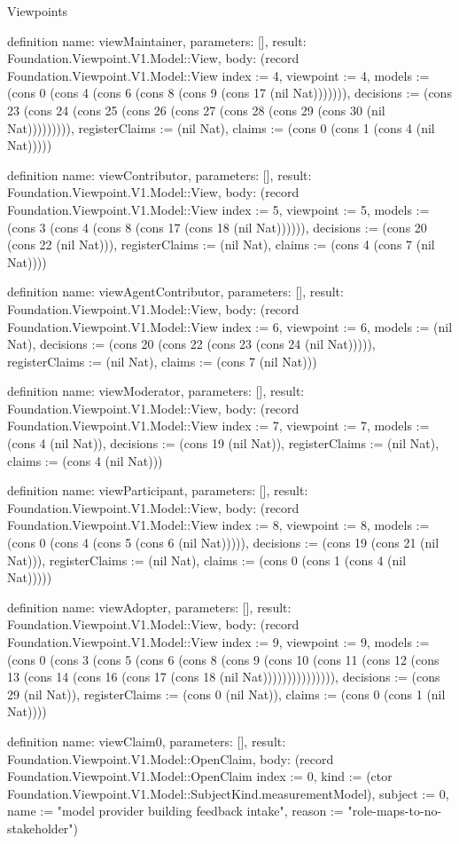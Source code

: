 \begin{lexlean}{Viewpoints}
\begin{semanticmodule}
definition{
  name: viewMaintainer,
  parameters: [],
  result: Foundation.Viewpoint.V1.Model::View,
  body: (record Foundation.Viewpoint.V1.Model::View {index := 4, viewpoint := 4, models := (cons 0 (cons 4 (cons 6 (cons 8 (cons 9 (cons 17 (nil Nat))))))), decisions := (cons 23 (cons 24 (cons 25 (cons 26 (cons 27 (cons 28 (cons 29 (cons 30 (nil Nat))))))))), registerClaims := (nil Nat), claims := (cons 0 (cons 1 (cons 4 (nil Nat))))})
}

definition{
  name: viewContributor,
  parameters: [],
  result: Foundation.Viewpoint.V1.Model::View,
  body: (record Foundation.Viewpoint.V1.Model::View {index := 5, viewpoint := 5, models := (cons 3 (cons 4 (cons 8 (cons 17 (cons 18 (nil Nat)))))), decisions := (cons 20 (cons 22 (nil Nat))), registerClaims := (nil Nat), claims := (cons 4 (cons 7 (nil Nat)))})
}

definition{
  name: viewAgentContributor,
  parameters: [],
  result: Foundation.Viewpoint.V1.Model::View,
  body: (record Foundation.Viewpoint.V1.Model::View {index := 6, viewpoint := 6, models := (nil Nat), decisions := (cons 20 (cons 22 (cons 23 (cons 24 (nil Nat))))), registerClaims := (nil Nat), claims := (cons 7 (nil Nat))})
}

definition{
  name: viewModerator,
  parameters: [],
  result: Foundation.Viewpoint.V1.Model::View,
  body: (record Foundation.Viewpoint.V1.Model::View {index := 7, viewpoint := 7, models := (cons 4 (nil Nat)), decisions := (cons 19 (nil Nat)), registerClaims := (nil Nat), claims := (cons 4 (nil Nat))})
}

definition{
  name: viewParticipant,
  parameters: [],
  result: Foundation.Viewpoint.V1.Model::View,
  body: (record Foundation.Viewpoint.V1.Model::View {index := 8, viewpoint := 8, models := (cons 0 (cons 4 (cons 5 (cons 6 (nil Nat))))), decisions := (cons 19 (cons 21 (nil Nat))), registerClaims := (nil Nat), claims := (cons 0 (cons 1 (cons 4 (nil Nat))))})
}

definition{
  name: viewAdopter,
  parameters: [],
  result: Foundation.Viewpoint.V1.Model::View,
  body: (record Foundation.Viewpoint.V1.Model::View {index := 9, viewpoint := 9, models := (cons 0 (cons 3 (cons 5 (cons 6 (cons 8 (cons 9 (cons 10 (cons 11 (cons 12 (cons 13 (cons 14 (cons 16 (cons 17 (cons 18 (nil Nat))))))))))))))), decisions := (cons 29 (nil Nat)), registerClaims := (cons 0 (nil Nat)), claims := (cons 0 (cons 1 (nil Nat)))})
}

definition{
  name: viewClaim0,
  parameters: [],
  result: Foundation.Viewpoint.V1.Model::OpenClaim,
  body: (record Foundation.Viewpoint.V1.Model::OpenClaim {index := 0, kind := (ctor Foundation.Viewpoint.V1.Model::SubjectKind.measurementModel), subject := 0, name := "model provider building feedback intake", reason := "role-maps-to-no-stakeholder"})
}


\end{semanticmodule}
\end{lexlean}
